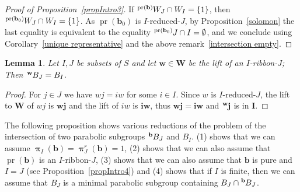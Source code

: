 \documentclass{amsart}
\numberwithin{equation}{section}
\newtheorem{lemma}[equation]{Lemma}
\newcommand\lexp[2]{\kern\scriptspace\vphantom{#2}^{#1}\kern-\scriptspace#2}
\newcommand\bb{{\mathbf b}}
\newcommand\bi{{\mathbf i}}
\newcommand\bj{{\mathbf j}}
\newcommand\bw{{\mathbf w}}
\newcommand\bI{{\mathbf I}}
\newcommand\bW{{\mathbf W}}
\DeclareMathOperator\pr{pr}
\DeclareMathOperator\bpi{\boldsymbol\pi}
\begin{document}
\begin{proof}[Proof of Proposition~\ref{propIntro3}]
If $\lexp {\pr(\bb)} W_J \cap  W_I = \{1\}$,  then $\lexp {\pr(\bb_0)} W_J \cap  W_I = \{1\}$. As $\pr(\bb_0)$ is $I$-reduced-$J$,  by Proposition~\ref{solomon} the last equality is equivalent to the equality  $\lexp {\pr(\bb_0)} J \cap  I = \emptyset$, and we conclude using Corollary~\ref{unique representative} and  the above remark~\ref{intersection empty}.
\end{proof}

\begin{lemma}\label{ribbon in B}
Let   $I,J$  be  subsets   of  $S$  and  let $\bw\in\bW$ be the lift of an $I$-ribbon-$J$;
Then $\lexp\bw B_J= B_I$.
\end{lemma}
\begin{proof}
For $j\in J$ we have $wj=iw$ for some $i\in I$. Since $w$ is $I$-reduced-$J$, the lift to
$\bW$ of
$wj$ is $\bw\bj$ and the lift of $iw$ is $\bi\bw$, thus $\bw\bj=\bi\bw$ and
$\lexp\bw\bj$ is in $\bI$. 
\end{proof}
The following proposition shows various reductions of the problem of
the intersection of two parabolic subgroups $\lexp{\bb}B_J$ and $B_I$. (1) shows that we can
assume $\bpi_I(\bb)=\bpi_J^r(\bb)=1$, (2) shows that we can also assume that
$\pr(\bb)$ is an $I$-ribbon-$J$, (3) shows that we can also assume that $\bb$ is
pure and $I=J$ (see Proposition~\ref{propIntro4}) and (4) shows that if $I$
is finite, then we can assume that $B_J$ is a minimal parabolic subgroup containing
$B_J\cap\lexp{\bb}B_J$.
\end{document}
